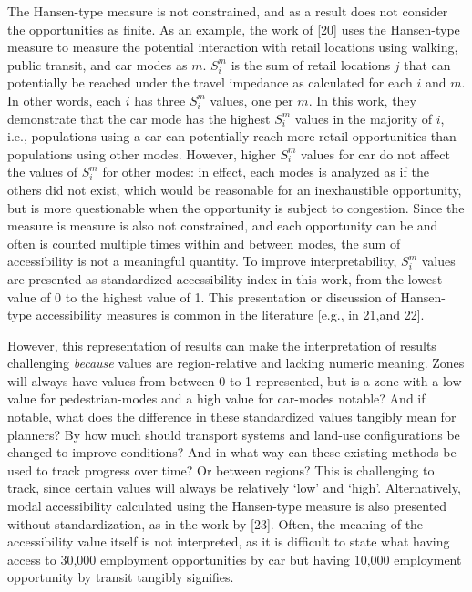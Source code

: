 \documentclass[10pt,letterpaper]{article}
\begin{document}
The Hansen-type measure is not constrained, and as a result does not
consider the opportunities as finite. As an example, the work of
{[}20{]} uses the Hansen-type measure to measure the potential
interaction with retail locations using walking, public transit, and car
modes as \(m\). \(S_i^m\) is the sum of retail locations \(j\) that can
potentially be reached under the travel impedance as calculated for each
\(i\) and \(m\). In other words, each \(i\) has three \(S_i^m\) values,
one per \(m\). In this work, they demonstrate that the car mode has the
highest \(S_i^{m}\) values in the majority of \(i\), i.e., populations
using a car can potentially reach more retail opportunities than
populations using other modes. However, higher \(S_i^{m}\) values for
car do not affect the values of \(S_i^{m}\) for other modes: in effect,
each modes is analyzed as if the others did not exist, which would be
reasonable for an inexhaustible opportunity, but is more questionable
when the opportunity is subject to congestion. Since the measure is
measure is also not constrained, and each opportunity can be and often
is counted multiple times within and between modes, the sum of
accessibility is not a meaningful quantity. To improve interpretability,
\(S_i^m\) values are presented as standardized accessibility index in
this work, from the lowest value of 0 to the highest value of 1. This
presentation or discussion of Hansen-type accessibility measures is
common in the literature {[}e.g., in 21,and 22{]}.

However, this representation of results can make the interpretation of
results challenging \emph{because} values are region-relative and
lacking numeric meaning. Zones will always have values from between 0 to
1 represented, but is a zone with a low value for pedestrian-modes and a
high value for car-modes notable? And if notable, what does the
difference in these standardized values tangibly mean for planners? By
how much should transport systems and land-use configurations be changed
to improve conditions? And in what way can these existing methods be
used to track progress over time? Or between regions? This is
challenging to track, since certain values will always be relatively
`low' and `high'. Alternatively, modal accessibility calculated using
the Hansen-type measure is also presented without standardization, as in
the work by {[}23{]}. Often, the meaning of the accessibility value
itself is not interpreted, as it is difficult to state what having
access to 30,000 employment opportunities by car but having 10,000
employment opportunity by transit tangibly signifies.
\end{document}

